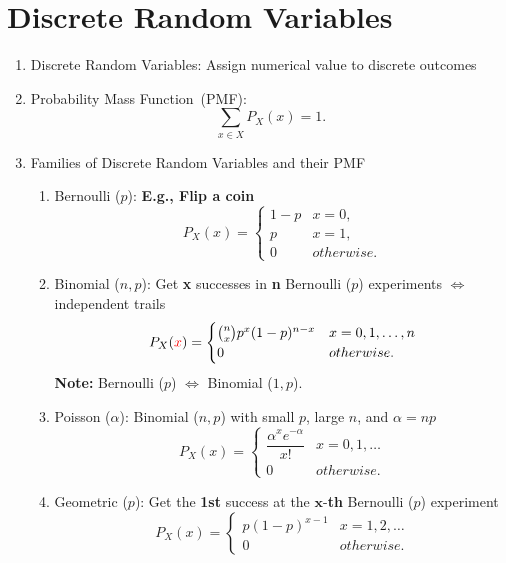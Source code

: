 \chapter{Discrete Random Variables}
\begin{enumerate}
    \item Discrete Random Variables: Assign numerical value to discrete outcomes
    \item Probability Mass Function~(PMF): \[\sum_{x\in X}P_X(x)=1.\]
    \item Families of Discrete Random Variables and their PMF{
        \begin{enumerate}
            \item Bernoulli ($p$): \textbf{E.g., Flip a coin}{
                \[ P_X(x) =
                \begin{cases}
                    1-p & x=0, \\
                    p   & x=1, \\
                    0   & otherwise.
                \end{cases} \]
            }
            \item Binomial ($n, p$): Get \textbf{x} successes in \textbf{n} Bernoulli ($p$) experiments $\iff$ independent trails{
                \[P_X(\textcolor{red}{x}) = {
                    \begin{cases}
                        \binom{n}{x}p^x(1-p)^{n-x} & x=0,1,\ldots,n \\
                        0 & otherwise.
                    \end{cases}
                }\]
                \textbf{Note:} Bernoulli ($p$) $\iff$ Binomial ($1, p$).
            }
            \item Poisson ($\alpha$): Binomial ($n, p$) with small $p$, large $n$, and $\alpha=np${
                \[ P_X(x) =
                \begin{cases}
                    \dfrac{\alpha^x e^{-\alpha}}{x!}   & x=0,1,\ldots \\
                    0   & otherwise.
                \end{cases} \]
            }
            \item Geometric ($p$): Get the \textbf{1st} success at the $\bm{x}$-\textbf{th} Bernoulli ($p$) experiment {
                \[ P_X(x) =
                \begin{cases}
                    p(1-p)^{x-1} & x=1,2,\ldots \\
                    0   & otherwise.

\end{cases}\]}
\end{enumerate}}
\end{enumerate}

